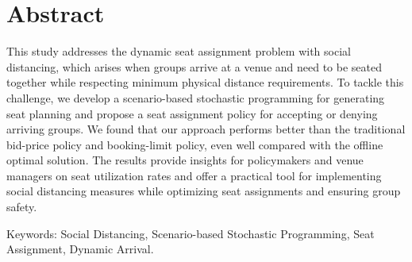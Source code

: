 
\section*{Abstract}

This study addresses the dynamic seat assignment problem with social distancing, which arises when groups arrive at a venue and need to be seated together while respecting minimum physical distance requirements. To tackle this challenge, we develop a scenario-based stochastic programming for generating seat planning and propose a seat assignment policy for accepting or denying arriving groups. We found that our approach performs better than the traditional bid-price policy and booking-limit policy, even well compared with the offline optimal solution. The results provide insights for policymakers and venue managers on seat utilization rates and offer a practical tool for implementing social distancing measures while optimizing seat assignments and ensuring group safety.


Keywords: Social Distancing, Scenario-based Stochastic Programming, Seat Assignment, Dynamic Arrival.

